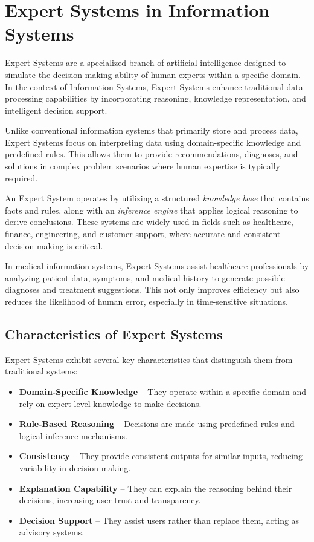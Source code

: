 \documentclass[12pt]{article}
\begin{document}
\newpage
\section{Expert Systems in Information Systems}

Expert Systems are a specialized branch of artificial intelligence designed to simulate the decision-making ability of human experts within a specific domain. In the context of Information Systems, Expert Systems enhance traditional data processing capabilities by incorporating reasoning, knowledge representation, and intelligent decision support.

Unlike conventional information systems that primarily store and process data, Expert Systems focus on interpreting data using domain-specific knowledge and predefined rules. This allows them to provide recommendations, diagnoses, and solutions in complex problem scenarios where human expertise is typically required.

An Expert System operates by utilizing a structured \textit{knowledge base} that contains facts and rules, along with an \textit{inference engine} that applies logical reasoning to derive conclusions. These systems are widely used in fields such as healthcare, finance, engineering, and customer support, where accurate and consistent decision-making is critical.

In medical information systems, Expert Systems assist healthcare professionals by analyzing patient data, symptoms, and medical history to generate possible diagnoses and treatment suggestions. This not only improves efficiency but also reduces the likelihood of human error, especially in time-sensitive situations.

\subsection{Characteristics of Expert Systems}

Expert Systems exhibit several key characteristics that distinguish them from traditional systems:

\begin{itemize}
    \item \textbf{Domain-Specific Knowledge} -- They operate within a specific domain and rely on expert-level knowledge to make decisions.
    
    \item \textbf{Rule-Based Reasoning} -- Decisions are made using predefined rules and logical inference mechanisms.
    
    \item \textbf{Consistency} -- They provide consistent outputs for similar inputs, reducing variability in decision-making.
    
    \item \textbf{Explanation Capability} -- They can explain the reasoning behind their decisions, increasing user trust and transparency.
    
    \item \textbf{Decision Support} -- They assist users rather than replace them, acting as advisory systems.
\end{itemize}
\end{document}
